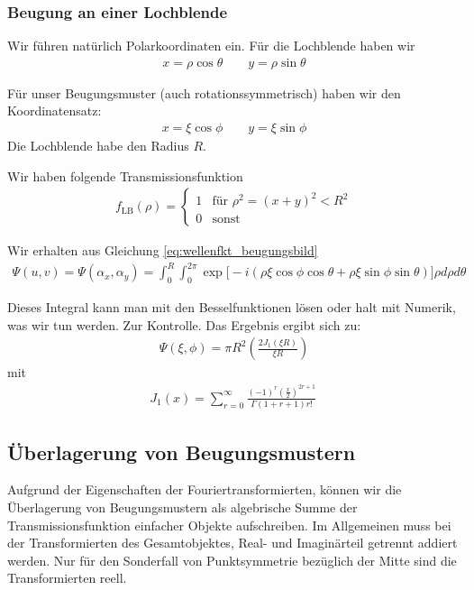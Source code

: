 \documentclass[a4paper]{article}
\begin{document}
\subsubsection{Beugung an einer Lochblende}
Wir führen natürlich Polarkoordinaten ein. Für die Lochblende haben wir
\begin{align}
x= \rho \cos \theta \qquad y = \rho \sin \theta
\end{align}

Für unser Beugungsmuster (auch rotationssymmetrisch) haben wir den Koordinatensatz:
\begin{align}
x= \xi \cos \phi \qquad y= \xi \sin \phi
\end{align}
Die Lochblende habe den Radius $R$.

Wir haben folgende Transmissionsfunktion 
\begin{align}
f_\text{LB}(\rho) = \begin{cases} 
1  &\text{für } \rho^2 = (x+y)^2 <  R^2 \\
0 & \text{sonst}\end{cases}
\label{eq:lochblende}
\end{align}

Wir erhalten aus Gleichung \ref{eq:wellenfkt_beugungsbild}
\begin{align}
\Psi(u,v)=\Psi(\alpha_x,\alpha_y) = \int_0^R \int_0^{2\pi} \exp\Big[ -i (\rho \xi \cos\phi\cos\theta + \rho\xi\sin\phi\sin\theta) \Big] \rho d\rho d\theta
\end{align}

Dieses Integral kann man mit den Besselfunktionen lösen oder halt mit Numerik, was wir tun werden.
Zur Kontrolle. Das Ergebnis ergibt sich zu:
\begin{align}
\Psi (\xi,\phi ) = \pi R^2 \left( \frac{2J_1(\xi R)}{\xi R} \right)
\end{align}
mit 
\begin{align}
J_{1}(x)=\sum _{{r=0}}^{\infty }{\frac  {(-1)^{r}({\frac  {x}{2}})^{{2r+1 }}}{\Gamma (1 +r+1)r!}}\, 
\end{align}
\subsection{Überlagerung von Beugungsmustern}
Aufgrund der Eigenschaften der Fouriertransformierten, können wir die Überlagerung von Beugungsmustern als algebrische Summe der Transmissionsfunktion einfacher Objekte aufschreiben. Im Allgemeinen muss bei der Transformierten des Gesamtobjektes, Real- und Imaginärteil getrennt addiert werden. Nur für den Sonderfall von Punktsymmetrie bezüglich der Mitte sind die Transformierten reell. 
\end{document}
